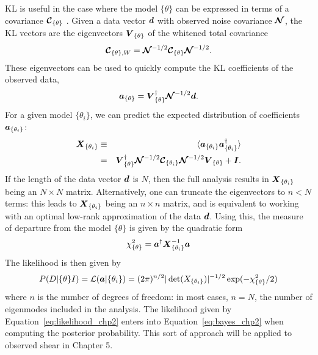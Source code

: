 KL is useful in the case where the model $\{\theta\}$ can be expressed in
terms of a covariance $\boldsymbol{\mathcal{C}}_{\{\theta\}}$ \citep[see][]{Vogeley96}.
Given a data vector $\boldsymbol{d}$ with observed noise covariance
$\boldsymbol{\mathcal{N}}$, the KL vectors are the eigenvectors
$\boldsymbol{V}_{\{\theta\}}$ of the whitened total covariance 
\begin{equation}
  \boldsymbol{\mathcal{C}}_{\{\theta\}, W} =
  \boldsymbol{\mathcal{N}}^{-1/2}
  \boldsymbol{\mathcal{C}}_{\{\theta\}}
  \boldsymbol{\mathcal{N}}^{-1/2}.
\end{equation}
These eigenvectors can be used to quickly compute the KL coefficients of
the observed data,
\begin{equation}
  \boldsymbol{a}_{\{\theta\}} = \boldsymbol{V}^\dagger_{\{\theta\}}
  \boldsymbol{\mathcal{N}}^{-1/2}\boldsymbol{d}.
\end{equation}
For a given model $\{\theta_i\}$, we can predict the expected
distribution of coefficients $\boldsymbol{a}_{\{\theta_i\}}$:
\begin{eqnarray}
  \boldsymbol{X}_{\{\theta_i\}}
  & \equiv & \langle\boldsymbol{a}_{\{\theta_i\}}
  \boldsymbol{a}_{\{\theta_i\}}^\dagger\rangle\nonumber\\
  &=& \boldsymbol{V}_{\{\theta\}}^\dagger \boldsymbol{\mathcal{N}}^{-1/2} 
  \boldsymbol{\mathcal{C}}_{\{\theta_i\}}\boldsymbol{\mathcal{N}}^{-1/2}\boldsymbol{V}_{\{\theta\}}
  + \boldsymbol{I}.
\end{eqnarray}
If the length of the data vector $\boldsymbol{d}$ is $N$, then the full
analysis results in $\boldsymbol{X}_{\{\theta_i\}}$ being an $N\times N$ matrix.
Alternatively, one can truncate the eigenvectors to $n < N$ terms:
this leads to $\boldsymbol{X}_{\{\theta_i\}}$ being an $n\times n$ matrix, and
is equivalent to working with an optimal low-rank approximation of the
data $\boldsymbol{d}$.
Using this, the measure of departure from the model $\{\theta\}$
is given by the quadratic form
\begin{equation}
  \chi_{\{\theta\}}^2 = \boldsymbol{a}^\dagger\boldsymbol{X}_{\{\theta_i\}}^{-1}\boldsymbol{a}
\end{equation}
The likelihood is then given by
\begin{equation}
  \label{eq:likelihood_chp2}
  P(D|\{\theta\}I) =
  \mathcal{L}(\boldsymbol{a}|\{\theta_i\}) = 
  (2\pi)^{n/2} |\det(X_{\{\theta_i\}})|^{-1/2}
  \exp(-\chi_{\{\theta\}}^2/2)
\end{equation}
where $n$ is the number of degrees of freedom: in most cases, $n = N$, the
number of eigenmodes included in the analysis.  The likelihood given by
Equation~\ref{eq:likelihood_chp2} enters into Equation~\ref{eq:bayes_chp2}
when computing the posterior probability.  This sort of approach will be
applied to observed shear in Chapter 5.

